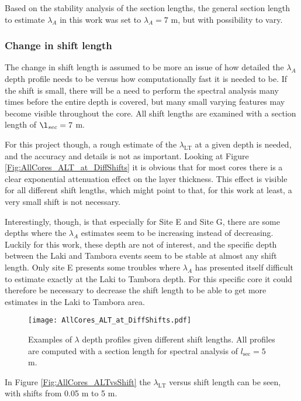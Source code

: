 \documentclass[../../CompleteThesis2/Complete_2ndDraft]{subfiles}
\begin{document}
Based on the stability analysis of the section lengths, the general section length to estimate $\lambda_A$ in this work was set to $\lambda_A=7$ m, but with possibility to vary.


\subsubsection[Change in $l_{shift}$]{Change in shift length}
\label{Subsubsec:SignalAnalysis_SpectralAnalysis_ALT_lshift}
The change in shift length is assumed to be more an issue of how detailed the $\lambda_A$ depth profile needs to be versus how computationally fast it is needed to be. If the shift is small, there will be a need to perform the spectral analysis many times before the entire depth is covered, but many small varying features may become visible throughout the core. All shift lengths are examined with a section length of $\l_{sec}=7$ m.

For this project though, a rough estimate of the $\lambda_{\text{LT}}$ at a given depth is needed, and the accuracy and details is not as important. Looking at Figure \ref{Fig:AllCores_ALT_at_DiffShifts} it is obvious that for most cores there is a clear exponential attenuation effect on the layer thickness. This effect is visible for all different shift lengths, which might point to that, for this work at least, a very small shift is not necessary.

Interestingly, though, is that especially for Site E and Site G, there are some depths where the $\lambda_A$ estimates seem to be increasing instead of decreasing. Luckily for this work, these depth are not of interest, and the specific depth between the Laki and Tambora events seem to be stable at almost any shift length. Only site E presents some troubles where $\lambda_A$ has presented itself difficult to estimate exactly at the Laki to Tambora depth. For this specific core it could therefore be necessary to decrease the shift length to be able to get more estimates in the Laki to Tambora area.
\begin{figure}[h]
	\centering
	\texttt{[image: AllCores\_ALT\_at\_DiffShifts.pdf]}
	\caption[$\lambda$ Depth Profiles, Different $s_{\text{sec}}$]{\small Examples of $\lambda$ depth profiles given different shift lengths. All profiles are computed with a section length for spectral analysis of $l_{\text{sec}}=5$ m.}
	\label{fig:AllCores_ALT_at_DiffShifts}
\end{figure}

In Figure \ref{Fig:AllCores_ALTvsShift} the $\lambda_{\text{LT}}$ versus shift length can be seen, with shifts from 0.05 m to 5 m.
\end{document}
